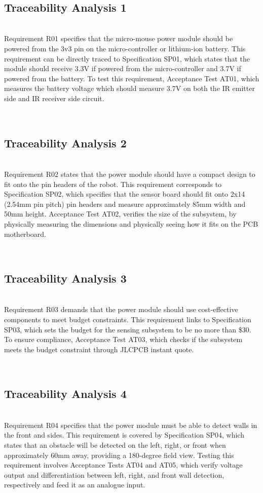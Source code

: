 \documentclass[class=report,11pt,crop=false]{standalone}
\begin{document}
\\ \subsection{Traceability Analysis 1} \\
Requirement R01 specifies that the micro-mouse power module should be powered from the 3v3 pin on the micro-controller or lithium-ion battery. This requirement can be directly traced to Specification SP01, which states that the module should receive 3.3V if powered from the micro-controller and 3.7V if powered from the battery. To test this requirement, Acceptance Test AT01, which measures the battery voltage which should measure 3.7V on both the IR emitter side and IR receiver side circuit.

\\ \subsection{Traceability Analysis 2} \\
Requirement R02 states that the power module should have a compact design to fit onto the pin headers of the robot. This requirement corresponds to Specification SP02, which specifies that the sensor board should fit onto 2x14 (2.54mm pin pitch) pin headers and measure approximately 85mm width and 50mm height. Acceptance Test AT02, verifies the size of the subsystem, by physically measuring the dimensions and physically seeing how it fits on the PCB motherboard.

\\ \subsection{Traceability Analysis 3} \\
Requirement R03 demands that the power module should use cost-effective components to meet budget constraints. This requirement links to Specification SP03, which sets the budget for the sensing subsystem to be no more than \$30. To ensure compliance, Acceptance Test AT03, which checks if the subsystem meets the budget constraint through JLCPCB instant quote.

\\ \subsection{Traceability Analysis 4} \\
Requirement R04 specifies that the power module must be able to detect walls in the front and sides. This requirement is covered by Specification SP04, which states that an obstacle will be detected on the left, right, or front when approximately 60mm away, providing a 180-degree field view. Testing this requirement involves Acceptance Tests AT04 and AT05, which verify voltage output and differentiation between left, right, and front wall detection, respectively and feed it as an analogue input.
\end{document}
